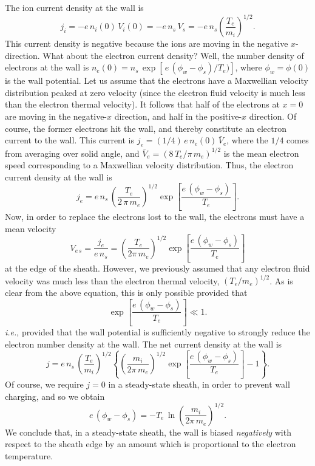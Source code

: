 The ion current density at the wall is
\begin{equation}
j_i = -e\,n_i(0)\,V_i(0) = -e\,n_s\,V_s = - e\,n_s\left(\frac{T_e}{m_i}\right)^{1/2}.
\end{equation}
This current density is negative because the ions are moving in the negative $x$-direction. What about the electron current density? Well, the
number density of electrons at the wall is $n_e(0) = n_s\,\exp[\,e\,(\phi_w-\phi_s)/T_e)]$, where $\phi_w=\phi(0)$ is the wall potential. Let us assume
that the electrons have a Maxwellian velocity distribution peaked at
zero velocity (since the electron fluid velocity is much less than the
electron thermal velocity). It follows that half of the electrons at $x=0$ are moving in
the negative-$x$ direction, and half in the positive-$x$ direction. 
Of course, the former electrons hit the wall, and thereby constitute an electron
current to the wall. This current is $j_e=(1/4)\,e\,n_e(0)\,\bar{V}_e$, where
the $1/4$ comes from averaging over solid angle, and $\bar{V}_e=(8\,T_e/\pi\,m_e)^{1/2}$ is the mean electron speed corresponding to a
Maxwellian velocity distribution. Thus, the electron current density at the wall
is
\begin{equation}
j_e= e\,n_s\,\left(\frac{T_e}{2\,\pi\,m_e}\right)^{1/2} \exp\left[\frac{e\,(\phi_w-\phi_s)}{T_e}\right].
\end{equation}
Now, in order to replace the electrons lost to the wall, the electrons must have a mean velocity
\begin{equation}
V_{e\,s} = \frac{j_e}{e\,n_s}= \left(\frac{T_e}{2\pi\,m_e}\right)^{1/2} \exp\left[\frac{e\,(\phi_w-\phi_s)}{T_e}\right]
\end{equation}
at the edge of the sheath. However, we previously assumed that any
electron fluid velocity was much less than the electron thermal
velocity, $(T_e/m_e)^{1/2}$. As is clear from the above equation,
this is only possible provided that
\begin{equation}
\exp\left[\frac{e\,(\phi_w-\phi_s)}{T_e}\right]\ll 1.
\end{equation}
{\em i.e.}, provided that the wall potential is sufficiently negative to
strongly reduce the electron number density at the wall.
The net current density at the wall is
\begin{equation}\label{e3.279}
j = e\,n_s\,\left(\frac{T_e}{m_i}\right)^{1/2}\left\{\left(\frac{m_i}{2\pi\,m_e}\right)^{1/2}\exp\left[\frac{e\,(\phi_w-\phi_s)}{T_e}\right]-1\right\}.
\end{equation}
Of course, we require $j=0$ in a steady-state sheath, in order to prevent wall charging, and so we obtain
\begin{equation}
e\,(\phi_w-\phi_s)= -T_e\,\ln\left(\frac{m_i}{2\pi\,m_e}\right)^{1/2}.
\end{equation}
We conclude that, in a steady-state sheath, the wall is biased {\em negatively}\/ with respect to  the
sheath edge by an amount which is proportional to the electron temperature.


